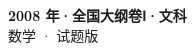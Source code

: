\documentclass[zihao=-4, a4paper]{ctexart}
\begin{document}
\begin{center}
  {\Large\bfseries 2008 年·全国大纲卷Ⅰ·文科}\\[4pt]
  {\large 数学 · 试题版}
\end{center}
\medskip
{}

\end{document}
